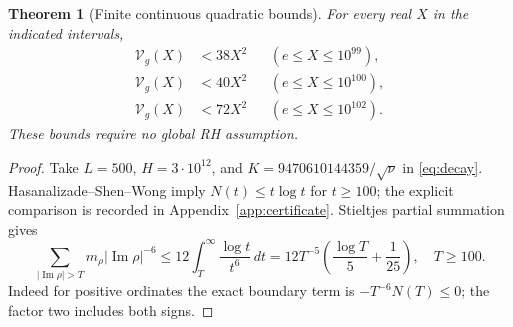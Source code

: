 \documentclass[11pt]{article}
\newtheorem{theorem}{Theorem}[section]
\theoremstyle{remark}
\newcommand{\dd}{\,d}
\newcommand{\Vcal}{\mathcal V_g}
\newcommand{\Ima}{\operatorname{Im}}
\numberwithin{equation}{section}
\begin{document}
\begin{theorem}[Finite continuous quadratic bounds]\label{thm:finite}
For every real $X$ in the indicated intervals,
\begin{equation}\label{eq:finite}
\begin{aligned}
\Vcal(X)&<38X^2 &&(e\le X\le10^{99}),\\
\Vcal(X)&<40X^2 &&(e\le X\le10^{100}),\\
\Vcal(X)&<72X^2 &&(e\le X\le10^{102}).
\end{aligned}
\end{equation}
These bounds require no global RH assumption.
\end{theorem}
\begin{proof}
Take $L=500$, $H=3\cdot10^{12}$, and
$K=9470610144359/\sqrt\nu$ in \eqref{eq:decay}.
Hasanalizade--Shen--Wong \cite[Corollary 1.2]{HSW} imply
$N(t)\le t\log t$ for $t\ge100$; the explicit comparison is recorded
in Appendix~\ref{app:certificate}. Stieltjes partial summation gives
\begin{equation}\label{eq:tail}
\sum_{|\Ima\rho|>T}m_\rho|\Ima\rho|^{-6}
\le12\int_T^\infty\frac{\log t}{t^6}\dd t
=12T^{-5}\left(\frac{\log T}{5}+\frac1{25}\right),\quad T\ge100.
\end{equation}
Indeed for positive ordinates the exact boundary term is
$-T^{-6}N(T)\le0$; the factor two includes both signs.


\end{proof}
\end{document}
